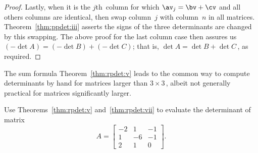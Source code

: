 \begin{proof}
Lastly, when it is the \(j\)th~column for which \(\av_j=\bv+\cv\) and all others columns are identical, then swap column~\(j\) with column~\(n\) in all matrices.  
Theorem~\ref{thm:ppdet:iii} asserts the signs of the three determinants are changed by this swapping.
The above proof for the last column case then assures us \((-\det A)=(-\det B)+(-\det C)\); that is, \(\det A=\det B+\det C\)\,, as required. 
\end{proof}


The sum formula Theorem~\ref{thm:rpdet:v} leads to the common way to compute determinants by hand for matrices larger than \(3\times3\)\,, albeit not generally practical for matrices significantly larger.

\begin{example} \label{eg:}
Use Theorems~\ref{thm:rpdet:v} and~\ref{thm:rpdet:vii} to evaluate the determinant of matrix
\begin{equation*}
A=\begin{bmatrix}   -2&1&-1
\\   1 & -6 & -1
\\   2 &  1 & 0
\end{bmatrix}.
\end{equation*}


\end{example}

